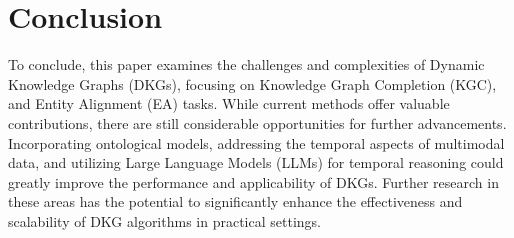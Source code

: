 \section{Conclusion}

To conclude, this paper examines the challenges and complexities of Dynamic Knowledge Graphs (DKGs), focusing on Knowledge Graph Completion (KGC), and Entity Alignment (EA) tasks. 
While current methods offer valuable contributions, there are still considerable opportunities for further advancements. Incorporating ontological models, addressing the temporal aspects of 
multimodal data, and utilizing Large Language Models (LLMs) for temporal reasoning could greatly improve the performance and applicability of DKGs. Further research in these areas has the 
potential to significantly enhance the effectiveness and scalability of DKG algorithms in practical settings.